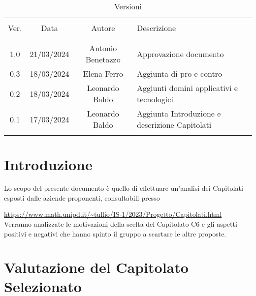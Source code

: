 \documentclass[italian,12pt]{article} %
\begin{document}


\newpage



\begin{table}[!h]
	\caption{Versioni}
	\begin{center}
		\begin{tabular}{ c c c p{9cm} }
			\hline                                                                              \\[-2ex]
			Ver. & Data       & Autore         & Descrizione                                    \\
			\\[-2ex] \hline \\[-1.5ex]
			1.0  & 21/03/2024 & Antonio Benetazzo    & Approvazione documento                   \\
			0.3  & 18/03/2024 & Elena Ferro    & Aggiunta di pro e contro                       \\
			0.2  & 18/03/2024 & Leonardo Baldo & Aggiunti domini applicativi e tecnologici      \\
			0.1  & 17/03/2024 & Leonardo Baldo & Aggiunta Introduzione e descrizione Capitolati \\
			\\[-1.5ex] \hline
		\end{tabular}
	\end{center}
\end{table}

\newpage

\tableofcontents

\newpage

\section{Introduzione}
Lo scopo del presente documento è quello di effettuare un'analisi dei Capitolati esposti
dalle aziende proponenti, consultabili presso

\url{https://www.math.unipd.it/~tullio/IS-1/2023/Progetto/Capitolati.html}\\
Verranno analizzate le motivazioni della scelta del Capitolato C6
e gli aspetti positivi e negativi che hanno spinto il gruppo a scartare le altre proposte.

\section{Valutazione del Capitolato Selezionato}
\end{document}
